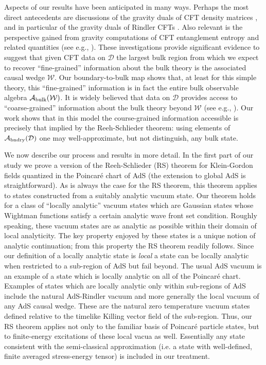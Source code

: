 \documentclass[12pt,a4paper]{article}
\numberwithin{equation}{section}
\def\cD{{\mathcal{D}}}
\def\cW{\mathcal{W}}
\def\cAbulk{{\mathcal{A}_{\rm bulk}}}
\def\cAbndry{{\mathcal{A}_{\rm bndry}}}
\begin{document}
Aspects of our results have been anticipated in many ways. 
Perhaps the most direct antecedents are discussions of the 
gravity duals of CFT density matrices \cite{Czech:2012bh,Bousso:2012sj}, 
and in particular of the gravity duals of Rindler CFTs
\cite{Emparan:1999gf,Czech:2012be,Parikh:2012kg,Bousso:2012mh}.
Also relevant is the perspective gained from gravity computations
of CFT entanglement entropy \cite{Ryu:2006bv,Hubeny:2007aa,Lewkowycz:2013nqa,
  Faulkner:2013ana} and related quantities (see e.g.,
\cite{Hubeny:2012wa,Casini:2009aa,Hayden:2011ag,Morrison:2012ab,
  Wall:2012uf,Hartman:2013qma,Blanco:2013joa,Kelly:2013aja}).
These investigations provide significant evidence to suggest that
given CFT data on $\cD$ the largest bulk region from which 
we expect to recover ``fine-grained'' information about the bulk theory 
is the associated causal wedge $\cW$. Our boundary-to-bulk map
shows that, at least for this simple theory, this ``fine-grained'' 
information is
in fact the entire bulk observable algebra $\cAbulk(\cW)$.
It is widely believed that data on $\cD$ provides access to
``coarse-grained'' information about the bulk theory beyond $\cW$
(see e.g., \cite{Kraus:2002iv,Fidkowski:2004aa,Hubeny:2006yu,Hubeny:2012ry}).
Our work shows that in this model the course-grained information
accessible is precisely that implied by the Reeh-Schlieder theorem: using 
elements of $\cAbndry(\cD)$ one may well-approximate, but not distinguish, 
any bulk state.


We now describe our process and results in more detail.
In the first part of our study we prove a version of the 
Reeh-Schlieder (RS) theorem for Klein-Gordon fields quantized in the 
Poincar\'e chart of AdS
(the extension to global AdS is straightforward).
As is always the case for the RS theorem, this theorem applies
to states constructed from a suitably analytic vacuum state. 
Our theorem holds for a class of ``locally analytic'' vacuum states 
which are Gaussian states whose Wightman functions satisfy a 
certain analytic wave front set condition. Roughly speaking, these 
vacuum states 
are as analytic as possible within their domain of local analyticity.
The key property enjoyed by these states is a unique notion of
analytic continuation; from this property the RS theorem readily follows.
Since our definition of a locally analytic state is \emph{local} a state
can be locally analytic when restricted to a sub-region of AdS but
fail beyond. 
The usual AdS vacuum is an example of a state which is locally analytic 
on all of the Poincar\'e chart.
Examples of states which are locally analytic only within sub-regions
of AdS include the natural AdS-Rindler vacuum and more generally
the local vacuum of any AdS causal wedge.
These are the natural zero temperature vacuum states defined 
relative to the timelike Killing vector field of the sub-region.
Thus, our RS theorem applies not only to the familiar basis of 
Poincar\'e particle states, but to finite-energy excitations of
these local vacua as well. Essentially any state consistent with
the semi-classical approximation (i.e. a state with well-defined,
finite averaged stress-energy tensor) is included in our
treatment.
\end{document}
